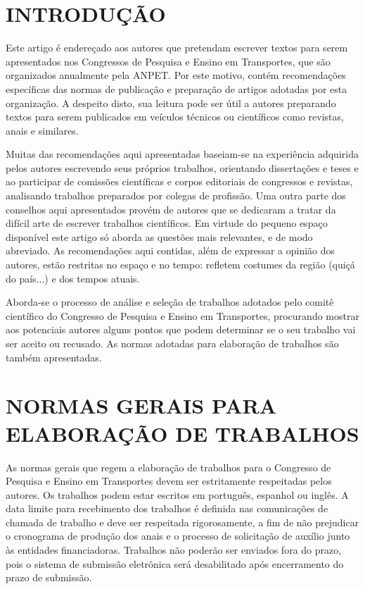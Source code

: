 \documentclass{anpet}
\begin{document}
\section{INTRODUÇÃO} {
Este artigo é endereçado aos autores que pretendam escrever textos para serem apresentados nos Congressos de Pesquisa e Ensino em Transportes, que são organizados anualmente pela ANPET. Por este motivo, contém recomendações específicas das normas de publicação e preparação de artigos adotadas por esta organização. A despeito disto, sua leitura pode ser útil a autores preparando textos para serem publicados em veículos técnicos ou científicos como revistas, anais e similares.

Muitas das recomendações aqui apresentadas baseiam-se na experiência adquirida pelos autores escrevendo seus próprios trabalhos, orientando dissertações e teses e ao participar de comissões científicas e corpos editoriais de congressos e revistas, analisando trabalhos preparados por colegas de profissão. Uma outra parte dos conselhos aqui apresentados provém de autores que se dedicaram a tratar da difícil arte de escrever trabalhos científicos. Em virtude do pequeno espaço disponível este artigo só aborda as questões mais relevantes, e de modo abreviado. As recomendações aqui contidas, além de expressar a opinião dos autores, estão restritas no espaço e no tempo: refletem costumes da região (quiçá do país...) e dos tempos atuais.

Aborda-se o processo de análise e seleção de trabalhos adotados pelo comitê científico do Congresso de Pesquisa e Ensino em Transportes, procurando mostrar aos potenciais autores alguns pontos que podem determinar se o seu trabalho vai ser aceito ou recusado. As normas adotadas para elaboração de trabalhos são também apresentadas.
}

\section{NORMAS GERAIS PARA ELABORAÇÃO DE TRABALHOS}
As normas gerais que regem a elaboração de trabalhos para o Congresso de Pesquisa e Ensino em Transportes devem ser estritamente respeitadas pelos autores. Os trabalhos podem estar escritos em português, espanhol ou inglês. A data limite para recebimento dos trabalhos é definida nas comunicações de chamada de trabalho e deve ser respeitada rigorosamente, a fim de não prejudicar o cronograma de produção dos anais e o processo de solicitação de auxílio junto às entidades financiadoras. Trabalhos não poderão ser enviados fora do prazo, pois o sistema de submissão eletrônica será desabilitado após encerramento do prazo de submissão.
\end{document}

